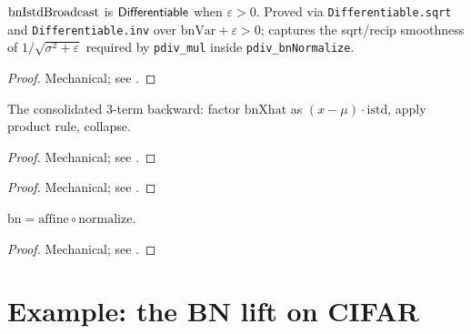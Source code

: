 \begin{theorem}
  \label{ax:bnIstdBroadcast_diff}
  \leanok
  \(\operatorname{bnIstdBroadcast}\) is \(\mathsf{Differentiable}\) when \(\varepsilon > 0\).
  Proved via \texttt{Differentiable.sqrt} and \texttt{Differentiable.inv}
  over \(\mathrm{bnVar} + \varepsilon > 0\); captures the sqrt/recip
  smoothness of \(1/\sqrt{\sigma^2 + \varepsilon}\) required by
  \texttt{pdiv\_mul} inside \texttt{pdiv\_bnNormalize}.
\end{theorem}

\begin{proof}
\leanok
Mechanical; see .
\end{proof}

\begin{theorem}
  \label{thm:bnNormalize_has_vjp}
  \leanok
  The consolidated 3-term backward: factor \(\mathrm{bnXhat}\) as
  \((x - \mu) \cdot \mathrm{istd}\), apply product rule, collapse.
\end{theorem}

\begin{proof}
\leanok
Mechanical; see .
\end{proof}

\begin{theorem}
  \label{thm:bnAffine_has_vjp}
  \leanok
\end{theorem}

\begin{proof}
\leanok
Mechanical; see .
\end{proof}

\begin{theorem}
  \label{thm:bn_has_vjp}
  \leanok
  \(\mathrm{bn} = \mathrm{affine} \circ \mathrm{normalize}\).
\end{theorem}

\begin{proof}
\leanok
Mechanical; see .
\end{proof}

\section{Example: the BN lift on CIFAR}
\label{sec:bn_cifar_example}

